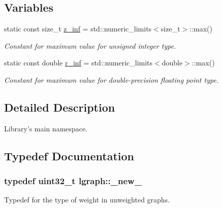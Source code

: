 \subsection*{Variables}
\begin{DoxyCompactItemize}
\item 
\hypertarget{namespacelgraph_a367229188e5a8c4e78e33866e3d46c48}{static const size\-\_\-t \hyperlink{namespacelgraph_a367229188e5a8c4e78e33866e3d46c48}{z\-\_\-inf} = std\-::numeric\-\_\-limits$<$size\-\_\-t$>$\-::max()}\label{namespacelgraph_a367229188e5a8c4e78e33866e3d46c48}

\begin{DoxyCompactList}\small\item\em Constant for maximum value for unsigned integer type. \end{DoxyCompactList}\item 
\hypertarget{namespacelgraph_a196c37be2b8b7c6631b9bee5fca0bed3}{static const double \hyperlink{namespacelgraph_a196c37be2b8b7c6631b9bee5fca0bed3}{r\-\_\-inf} = std\-::numeric\-\_\-limits$<$double$>$\-::max()}\label{namespacelgraph_a196c37be2b8b7c6631b9bee5fca0bed3}

\begin{DoxyCompactList}\small\item\em Constant for maximum value for double-\/precision floating point type. \end{DoxyCompactList}\end{DoxyCompactItemize}


\subsection{Detailed Description}
Library's main namespace. 

\subsection{Typedef Documentation}
\hypertarget{namespacelgraph_a2836f966c1c36b43da337d8907728ec0}{
\subsubsection[{\-\_\-new\-\_\-}]{\setlength{\rightskip}{0pt plus 5cm}typedef uint32\-\_\-t {\bf lgraph\-::\-\_\-new\-\_\-}}}\label{namespacelgraph_a2836f966c1c36b43da337d8907728ec0}


Typedef for the type of weight in unweighted graphs. 

